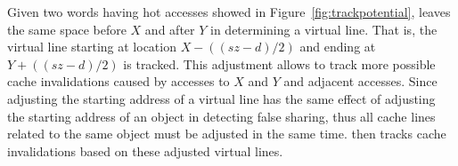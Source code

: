 Given two words having hot accesses showed in Figure~\ref{fig:trackpotential}, 
 leaves the same space before $X$ and after $Y$ in determining a virtual line. 
That is, the virtual line starting 
at location $X-((sz-d)/2)$ and ending at $Y+((sz-d)/2)$ is tracked. 
This adjustment allows to track more possible cache invalidations caused by
accesses to $X$ and $Y$ and adjacent accesses.
Since adjusting the starting address of a virtual line has the same effect of
adjusting the starting address of an object in detecting false sharing, thus
all cache lines related to the same object must be adjusted in the same time.
 then tracks cache invalidations based on these adjusted virtual lines.

